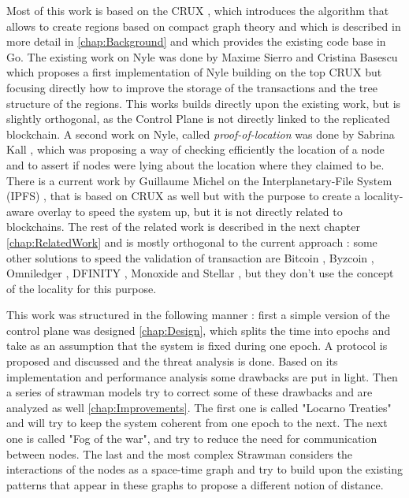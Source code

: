 \documentclass[a4paper,11pt,oneside]{report}
\begin{document}
Most of this work is based on the CRUX \cite{Basescu2014}, which introduces the
algorithm that allows to create regions based on compact graph theory and which is
described in more detail in \autoref{chap:Background} and which provides the existing code base in Go. The existing work on
Nyle was done by Maxime Sierro and Cristina Basescu \cite{Sierro2019} which
proposes a first implementation of Nyle building on the top CRUX
\cite{Basescu2014} but focusing directly how to improve the storage of the
transactions and the tree structure of the regions. This works builds directly
upon the existing work, but is slightly orthogonal, as the Control Plane is
not directly linked to the replicated blockchain.  A second work on Nyle, called \textit{proof-of-location} was
done by Sabrina Kall \cite{Kall2019}, which was proposing a way of checking
efficiently the location of a node and to assert if nodes were lying about the
location where they claimed to be. There is a current work by Guillaume Michel on the
Interplanetary-File System (IPFS) \cite{Michel2019}, that is based on CRUX as
well but with the purpose to create a locality-aware overlay to speed the
system up, but it is not directly related to blockchains. The rest of the
related work is described in the next chapter \autoref{chap:RelatedWork} and is
mostly orthogonal to the current approach : some other solutions to speed the
validation of transaction are Bitcoin \cite{Nakamoto2009}, Byzcoin
\cite{Kogias2016}, Omniledger \cite{Kokoris-Kogias2017},  DFINITY
\cite{Hanke2018}, Monoxide \cite{Wang2019} and Stellar \cite{Lokhava2019}, but
they don't use the concept of the locality for this purpose. 

This work was structured in the following manner : first a simple version of
the control plane was designed \autoref{chap:Design}, which splits the time into
epochs and take as an assumption that the system is fixed during one epoch. A
protocol is proposed and discussed and the threat analysis is done. Based on
its implementation and performance analysis some drawbacks are put in light.
Then a series of strawman models try to correct some of these drawbacks and are
analyzed as well \autoref{chap:Improvements}. The first one is called "Locarno
Treaties" and will try to keep the system coherent from one epoch to the next.
The next one is called "Fog of the war", and try to reduce the need for
communication between nodes. The last and the most complex Strawman considers the
interactions of the nodes as a space-time graph and try to build upon the
existing patterns that appear in these graphs to propose a different notion of distance. 
\end{document}
